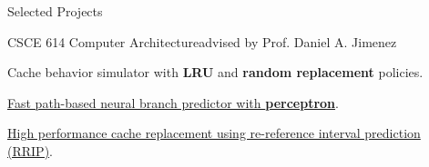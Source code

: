 \documentclass{resume} %
\begin{document}
\begin{rSection}{Selected Projects}
\begin{rSubsection}{CSCE 614 Computer Architecture}{advised by Prof. Daniel A. Jimenez}{}{}
\item Cache behavior simulator with \textbf{LRU} and \textbf{random replacement} policies.
\item \href{https://github.com/vincenttsang/CompArch/blob/master/branch-predictor/p1-final-report/p1-final-report.pdf}{Fast path-based neural branch predictor with \textbf{perceptron}}.
\item \href{https://github.com/vincenttsang/CompArch/blob/master/cache-replacer/p2-final-report/p2-final-report.pdf}{High performance cache replacement using re-reference interval prediction (RRIP)}.
\end{rSubsection}






\end{rSection}

\end{document}
